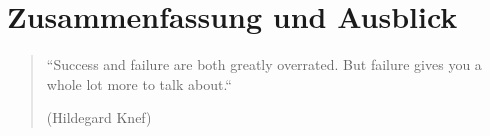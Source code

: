 

\chapter{Zusammenfassung und Ausblick} \label{chapter:conclusion}


\begin{quotation}
``Success and failure are both greatly overrated. But failure gives you a whole lot more to talk about.``
\begin{flushright}
(Hildegard Knef)
\end{flushright}
\end{quotation}
